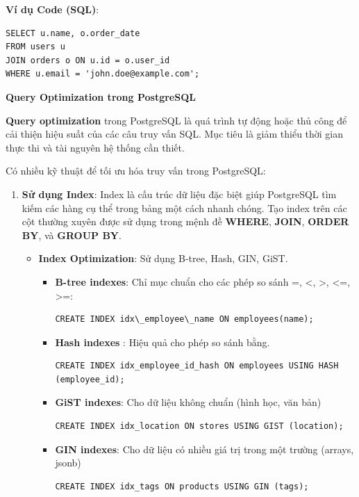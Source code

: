 \textbf{Ví dụ Code (SQL)}:

\begin{lstlisting}[style=sql, caption=Ví dụ query trong Postgres, label=sql:example]
SELECT u.name, o.order_date
FROM users u
JOIN orders o ON u.id = o.user_id
WHERE u.email = 'john.doe@example.com';
\end{lstlisting}


\textbf{Query Optimization trong PostgreSQL}

\textbf{Query optimization} trong PostgreSQL là quá trình tự động hoặc thủ công để cải thiện hiệu suất của các câu truy vấn SQL. Mục tiêu là giảm thiểu thời gian thực thi và tài nguyên hệ thống cần thiết.

Có nhiều kỹ thuật để tối ưu hóa truy vấn trong PostgreSQL:

\begin{enumerate}
    \item \textbf{Sử dụng Index}: Index là cấu trúc dữ liệu đặc biệt giúp PostgreSQL tìm kiếm các hàng cụ thể trong bảng một cách nhanh chóng. Tạo index trên các cột thường xuyên được sử dụng trong mệnh đề \textbf{WHERE}, \textbf{JOIN}, \textbf{ORDER BY}, và \textbf{GROUP BY}.
    \begin{itemize}
        \item \textbf{Index Optimization}: Sử dụng B-tree, Hash, GIN, GiST.
        \begin{itemize}
            \item \textbf{B-tree indexes}: Chỉ mục chuẩn cho các phép so sánh =, <, >, <=, >=:     
\begin{lstlisting}[style=sql, caption=Ví dụ sử dụng B-tree indexes trong Postgres, label=sql:example]
CREATE INDEX idx\_employee\_name ON employees(name);
\end{lstlisting}
            \item \textbf{Hash indexes} : Hiệu quả cho phép so sánh bằng.
\begin{lstlisting}[style=sql, caption=Ví dụ sử dụng Hash indexes trong Postgres, label=sql:example]
CREATE INDEX idx_employee_id_hash ON employees USING HASH (employee_id);
\end{lstlisting}
            \item \textbf{GiST indexes}: Cho dữ liệu không chuẩn (hình học, văn bản)
\begin{lstlisting}[style=sql, caption=Ví dụ sử dụng Hash indexes trong Postgres, label=sql:example]
CREATE INDEX idx_location ON stores USING GIST (location);
\end{lstlisting}
            \item \textbf{GIN indexes}: Cho dữ liệu có nhiều giá trị trong một trường (arrays, jsonb)
\begin{lstlisting}[style=sql, caption=Ví dụ sử dụng GIN indexes trong Postgres, label=sql:example]
CREATE INDEX idx_tags ON products USING GIN (tags);
\end{lstlisting}


\end{itemize}
\end{itemize}
\end{enumerate}
